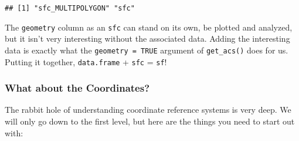 \documentclass[
]{article}
\newenvironment{Shaded}{\begin{snugshade}}{\end{snugshade}}
\newcommand{\FloatTok}[1]{\textcolor[rgb]{0.00,0.00,0.81}{#1}}
\newcommand{\FunctionTok}[1]{\textcolor[rgb]{0.00,0.00,0.00}{#1}}
\newcommand{\NormalTok}[1]{#1}
\newcommand{\SpecialCharTok}[1]{\textcolor[rgb]{0.00,0.00,0.00}{#1}}
\begin{document}
\begin{Shaded}
\end{Shaded}

\begin{verbatim}
## [1] "sfc_MULTIPOLYGON" "sfc"
\end{verbatim}

The \texttt{geometry} column as an \texttt{sfc} can stand on its own, be
plotted and analyzed, but it isn't very interesting without the
associated data. Adding the interesting data is exactly what the
\texttt{geometry\ =\ TRUE} argument of \texttt{get\_acs()} does for us.
Putting it together, \texttt{data.frame} + \texttt{sfc} = \texttt{sf}!

\hypertarget{what-about-the-coordinates}{%
\subsubsection{What about the
Coordinates?}\label{what-about-the-coordinates}}

The rabbit hole of understanding coordinate reference systems is very
deep. We will only go down to the first level, but here are the things
you need to start out with:
\end{document}
